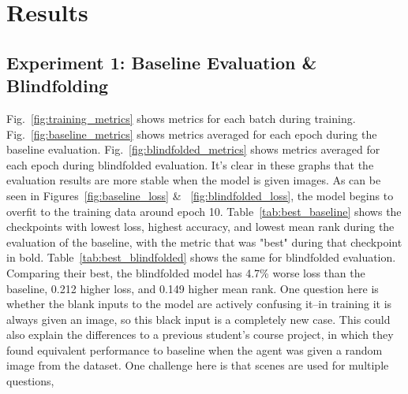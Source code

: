 \chapter{Results}
\section{Experiment 1: Baseline Evaluation \& Blindfolding}
Fig.~\ref{fig:training_metrics} shows metrics for each batch during training. %
Fig.~\ref{fig:baseline_metrics} shows metrics averaged for each epoch during the baseline evaluation. Fig.~\ref{fig:blindfolded_metrics} shows metrics averaged for each epoch during blindfolded evaluation. It's clear in these graphs that the evaluation results are more stable when the model is given images. As can be seen in Figures~\ref{fig:baseline_loss} \& ~\ref{fig:blindfolded_loss}, the model begins to overfit to the training data around epoch 10. \newline %
Table~\ref{tab:best_baseline} shows the checkpoints with lowest loss, highest accuracy, and lowest mean rank during the evaluation of the baseline, with the metric that was "best" during that checkpoint in bold. Table~\ref{tab:best_blindfolded} shows the same for blindfolded evaluation. Comparing their best, the blindfolded model has 4.7\% worse loss than the baseline, 0.212 higher loss, and 0.149 higher mean rank. \newline %
One question here is whether the blank inputs to the model are actively confusing it--in training it is always given an image, so this black input is a completely new case. This could also explain the differences to a previous student's course project, in which they found equivalent performance to baseline when the agent was given a random image from the dataset. One challenge here is that scenes are used for multiple questions, %
